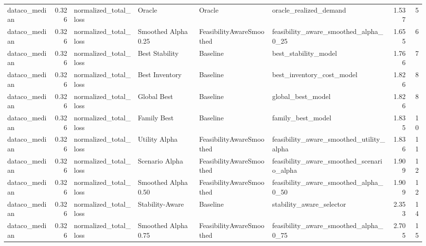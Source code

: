 \begin{table}
{\begin{tabular}{lrllllrr}
 dataco\_median &             0.326 &       normalized\_total\_loss &                Oracle &                    Oracle &                             oracle\_realized\_demand &         1.537 &               5 \\
 dataco\_median &             0.326 &       normalized\_total\_loss &   Smoothed Alpha 0.25 &  FeasibilityAwareSmoothed &              feasibility\_aware\_smoothed\_alpha\_0\_25 &         1.655 &               6 \\
 dataco\_median &             0.326 &       normalized\_total\_loss &        Best Stability &                  Baseline &                               best\_stability\_model &         1.766 &               7 \\
 dataco\_median &             0.326 &       normalized\_total\_loss &        Best Inventory &                  Baseline &                          best\_inventory\_cost\_model &         1.826 &               8 \\
 dataco\_median &             0.326 &       normalized\_total\_loss &           Global Best &                  Baseline &                                  global\_best\_model &         1.826 &               8 \\
 dataco\_median &             0.326 &       normalized\_total\_loss &           Family Best &                  Baseline &                                  family\_best\_model &         1.835 &              10 \\
 dataco\_median &             0.326 &       normalized\_total\_loss &         Utility Alpha &  FeasibilityAwareSmoothed &           feasibility\_aware\_smoothed\_utility\_alpha &         1.836 &              11 \\
 dataco\_median &             0.326 &       normalized\_total\_loss &        Scenario Alpha &  FeasibilityAwareSmoothed &          feasibility\_aware\_smoothed\_scenario\_alpha &         1.909 &              12 \\
 dataco\_median &             0.326 &       normalized\_total\_loss &   Smoothed Alpha 0.50 &  FeasibilityAwareSmoothed &              feasibility\_aware\_smoothed\_alpha\_0\_50 &         1.909 &              12 \\
 dataco\_median &             0.326 &       normalized\_total\_loss &       Stability-Aware &                  Baseline &                           stability\_aware\_selector &         2.353 &              14 \\
 dataco\_median &             0.326 &       normalized\_total\_loss &   Smoothed Alpha 0.75 &  FeasibilityAwareSmoothed &              feasibility\_aware\_smoothed\_alpha\_0\_75 &         2.705 &              15 \\

\end{tabular}}
\end{table}
